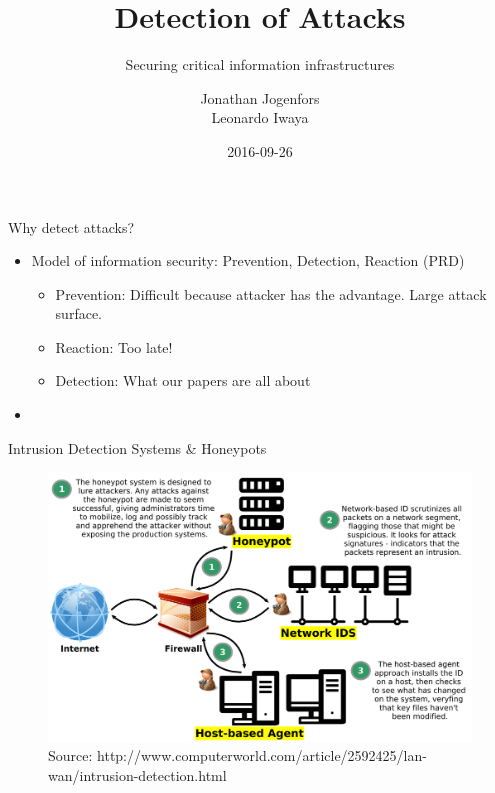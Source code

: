 \documentclass[compress]{beamer}
\title{Detection of Attacks}
\subtitle{Securing critical information infrastructures}
\author{Jonathan Jogenfors\\ Leonardo Iwaya}
\date{2016-09-26}
\begin{document}
\small
\frame{\titlepage{} }
\begin{frame}{Why detect attacks?}
    \begin{itemize}
        \item Model of information security: Prevention, Detection, Reaction
            (PRD)
            \begin{itemize}
                \item Prevention: Difficult because attacker has the advantage.
                    Large attack surface.


                \item
                    Reaction: Too late!
                \item
                    Detection: What our papers are all about
            \end{itemize}
        \item

    \end{itemize}
\end{frame}
\begin{frame}{Intrusion Detection Systems \& Honeypots}
\begin{figure}
 \centering
 \includegraphics[width=1.0\textwidth]{./images/ids-and-honeypot.png}
 \caption{Source: http://www.computerworld.com/article/2592425/lan-wan/intrusion-detection.html}
 \label{fig:ids-and-honeypot}
\end{figure}

\end{frame}
\end{document}
